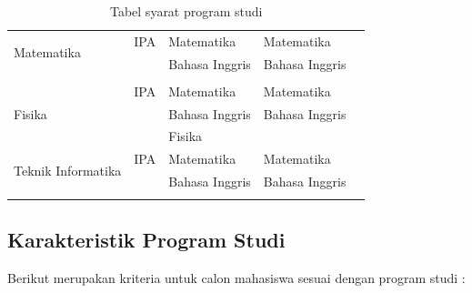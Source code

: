 \begin{longtable}[H]{|p{3cm}|p{2cm}|p{3cm}|p{3cm}|p{3cm}|}
		\hline
		\multirow{2}{10em}{Matematika} & IPA & Matematika & Matematika & \\
		& & Bahasa Inggris & Bahasa Inggris & \\
		& & & & \\
		
		\hline
		\multirow{3}{10em}{Fisika} & IPA & Matematika & Matematika & \\
		& & Bahasa Inggris & Bahasa Inggris & \\
		& & Fisika & & \\
		
		\hline
		\multirow{2}{10em}{Teknik Informatika} & IPA & Matematika & Matematika & \\
		& & Bahasa Inggris & Bahasa Inggris & \\
		
		\hline
	\caption{Tabel syarat program studi}
	\label{tab:tabel syarat program studi}
\end{longtable}

\subsection{Karakteristik Program Studi}
Berikut merupakan kriteria untuk calon mahasiswa sesuai dengan program studi :



